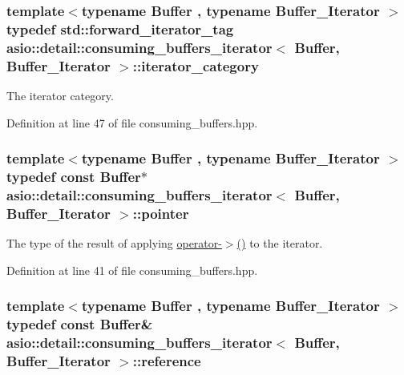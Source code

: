 \subsubsection[{iterator\+\_\+category}]{\setlength{\rightskip}{0pt plus 5cm}template$<$typename Buffer , typename Buffer\+\_\+\+Iterator $>$ typedef std\+::forward\+\_\+iterator\+\_\+tag {\bf asio\+::detail\+::consuming\+\_\+buffers\+\_\+iterator}$<$ Buffer, Buffer\+\_\+\+Iterator $>$\+::{\bf iterator\+\_\+category}}\label{classasio_1_1detail_1_1consuming__buffers__iterator_a23bcf111a9ac4efe9ce2daebd4bd11c9}


The iterator category. 



Definition at line 47 of file consuming\+\_\+buffers.\+hpp.

\hypertarget{classasio_1_1detail_1_1consuming__buffers__iterator_ae79f642abeaf9c9cd33a326a1cf00293}{}
\subsubsection[{pointer}]{\setlength{\rightskip}{0pt plus 5cm}template$<$typename Buffer , typename Buffer\+\_\+\+Iterator $>$ typedef const Buffer$\ast$ {\bf asio\+::detail\+::consuming\+\_\+buffers\+\_\+iterator}$<$ Buffer, Buffer\+\_\+\+Iterator $>$\+::{\bf pointer}}\label{classasio_1_1detail_1_1consuming__buffers__iterator_ae79f642abeaf9c9cd33a326a1cf00293}


The type of the result of applying \hyperlink{classasio_1_1detail_1_1consuming__buffers__iterator_a2eaf29938b709e047a7d77ce79113a59}{operator-\/$>$()} to the iterator. 



Definition at line 41 of file consuming\+\_\+buffers.\+hpp.

\hypertarget{classasio_1_1detail_1_1consuming__buffers__iterator_afb896cbf35f476cb828083b5439d0991}{}
\subsubsection[{reference}]{\setlength{\rightskip}{0pt plus 5cm}template$<$typename Buffer , typename Buffer\+\_\+\+Iterator $>$ typedef const Buffer\& {\bf asio\+::detail\+::consuming\+\_\+buffers\+\_\+iterator}$<$ Buffer, Buffer\+\_\+\+Iterator $>$\+::{\bf reference}}\label{classasio_1_1detail_1_1consuming__buffers__iterator_afb896cbf35f476cb828083b5439d0991}


